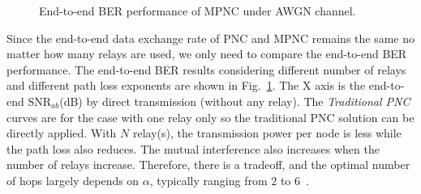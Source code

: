 \begin{figure} [th]
    \centering
    \caption{End-to-end BER performance of MPNC under AWGN channel.}\label{ber-D-MPNC}
\end{figure}

Since the end-to-end data exchange rate of PNC and MPNC remains the same no matter how many relays are used, we only need to compare the end-to-end BER performance. 
The end-to-end BER results considering different number of relays and different path loss exponents are shown in Fig.~\ref{ber-D-MPNC}. The X axis is the end-to-end $\text{SNR}_{ab}$(dB) by direct transmission (without any relay). The \textit{Traditional PNC} curves are for the case with one relay only so the traditional PNC solution can be directly applied. 
With $N$ relay(s), the transmission power per node is  less while the path loss also reduces. The mutual interference also increases when the number of relays increase. Therefore, there is a tradeoff, and the optimal number of hops largely depends on $\alpha$, typically  ranging  from $2$ to $6$~\cite{goldsmith2005wireless}. 

